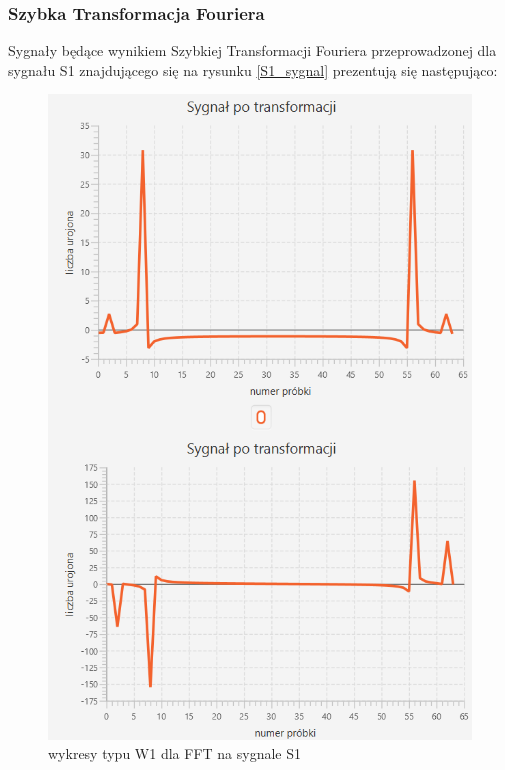 \documentclass[12pt]{article}
\begin{document}
\subsubsection{Szybka Transformacja Fouriera}
Sygnały będące wynikiem Szybkiej Transformacji Fouriera przeprowadzonej dla sygnału S1 znajdującego się na rysunku \ref{S1_sygnal} prezentują się następująco:
\begin{figure}[H]
	\centering
	\includegraphics[width=\linewidth]{S1_FFT_W1.png}
	\caption{wykresy typu W1 dla FFT na sygnale S1}
	\label{S1_FFT_W1}
\end{figure}
\end{document}
